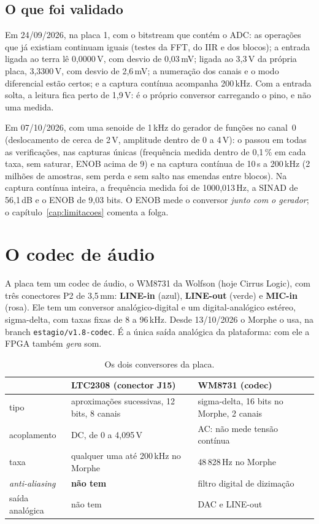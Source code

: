 \subsection{O que foi validado}
\label{sec:adc-validado}

Em 24/09/2026, na placa 1, com o bitstream que contém o ADC: as operações que
já existiam continuam iguais (testes da FFT, do IIR e dos blocos); a entrada
ligada ao terra lê 0,0000\,V, com desvio de 0,03\,mV; ligada ao 3,3\,V da
própria placa, 3,3300\,V, com desvio de 2,6\,mV; a numeração dos canais e o
modo diferencial estão certos; e a captura contínua acompanha 200\,kHz.
Com a entrada solta, a leitura fica perto de 1,9\,V: é o próprio conversor
carregando o pino, e não uma medida.

Em 07/10/2026, com uma senoide de 1\,kHz do gerador de funções no canal~0
(deslocamento de cerca de 2\,V, amplitude dentro de 0 a 4\,V): o
 passou em todas as verificações, nas capturas únicas
(frequência medida dentro de 0,1\,\% em cada taxa, sem saturar, ENOB acima de 9)
e na captura contínua de 10\,s a 200\,kHz (2 milhões de amostras, sem perda e
sem salto nas emendas entre blocos). Na captura contínua inteira, a frequência
medida foi de 1000,013\,Hz, a SINAD de 56,1\,dB e o ENOB de 9,03 bits. O ENOB
mede o conversor \emph{junto com o gerador}; o capítulo~\ref{cap:limitacoes}
comenta a folga.

\section{O codec de áudio}
\label{sec:codec}

A placa tem um codec de áudio, o WM8731 da Wolfson (hoje Cirrus Logic), com três
conectores P2 de 3,5\,mm: \textbf{LINE-in} (azul), \textbf{LINE-out} (verde) e
\textbf{MIC-in} (rosa). Ele tem um conversor analógico-digital e um
digital-analógico estéreo, sigma-delta, com taxas fixas de 8 a 96\,kHz. Desde
13/10/2026 o Morphe o usa, na branch \texttt{estagio/v1.8-codec}. É a única
saída analógica da plataforma: com ele a FPGA também \emph{gera} som.

\begin{table}[htbp]
  \centering
  \small
  \caption{Os dois conversores da placa.}
  \label{tab:adc-codec}
  \begin{tabularx}{\textwidth}{@{}lXX@{}}
    \toprule
    & \textbf{LTC2308 (conector J15)} & \textbf{WM8731 (codec)} \\
    \midrule
    tipo & aproximações sucessivas, 12 bits, 8 canais
      & sigma-delta, 16 bits no Morphe, 2 canais \\
    acoplamento & DC, de 0 a 4,095\,V & AC: não mede tensão contínua \\
    taxa & qualquer uma até 200\,kHz no Morphe & 48\,828\,Hz no Morphe \\
    \emph{anti-aliasing} & \textbf{não tem} & filtro digital de dizimação \\
    saída analógica & não tem & DAC e LINE-out \\
    \bottomrule
  \end{tabularx}
\end{table}

